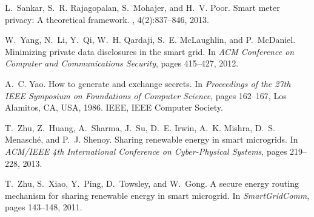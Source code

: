 \documentclass{article}
\begin{document}
\begin{thebibliography}{10}
	L.~Sankar, S.~R. Rajagopalan, S.~Mohajer, and H.~V. Poor.
	\newblock Smart meter privacy: A theoretical framework.
	, 4(2):837--846, 2013.
	
	W.~Yang, N.~Li, Y.~Qi, W.~H. Qardaji, S.~E. McLaughlin, and P.~McDaniel.
	\newblock Minimizing private data disclosures in the smart grid.
	\newblock In {\em ACM Conference on Computer and Communications Security},
	pages 415--427, 2012.
	
	A.~C. Yao.
	\newblock How to generate and exchange secrets.
	\newblock In {\em Proceedings of the 27th {IEEE} Symposium on Foundations of
		Computer Science}, pages 162--167, Los Alamitos, CA, USA, 1986. IEEE, IEEE
	Computer Society.
	
	T.~Zhu, Z.~Huang, A.~Sharma, J.~Su, D.~E. Irwin, A.~K. Mishra, D.~S.
	Menasch{\'{e}}, and P.~J. Shenoy.
	\newblock Sharing renewable energy in smart microgrids.
	\newblock In {\em {ACM/IEEE} 4th International Conference on Cyber-Physical
		Systems}, pages 219--228, 2013.
	
	T.~Zhu, S.~Xiao, Y.~Ping, D.~Towsley, and W.~Gong.
	\newblock A secure energy routing mechanism for sharing renewable energy in
	smart microgrid.
	\newblock In {\em SmartGridComm}, pages 143--148, 2011.
	
\end{thebibliography}
\end{document}
